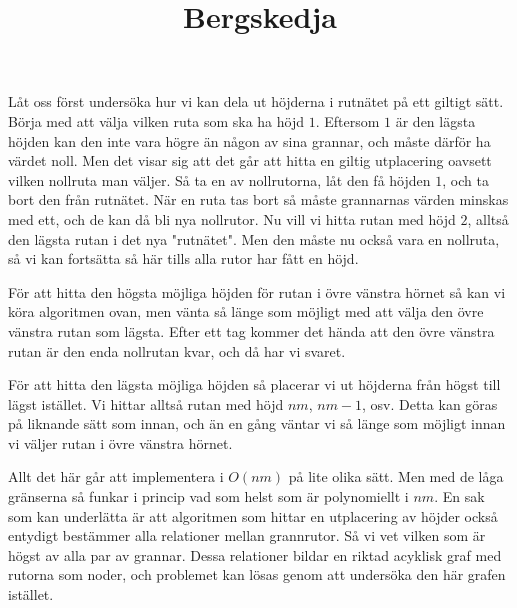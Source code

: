 \documentclass[a4paper,10pt]{article}
\begin{document}
 
\title{Bergskedja}
\date{}
\maketitle

Låt oss först undersöka hur vi kan dela ut höjderna i rutnätet på ett giltigt sätt. Börja med att välja vilken ruta som ska ha höjd $1$. Eftersom $1$ är den lägsta höjden kan den inte vara högre än någon av sina grannar, och måste därför ha värdet noll. Men det visar sig att det går att hitta en giltig utplacering oavsett vilken nollruta man väljer. Så ta en av nollrutorna, låt den få höjden $1$, och ta bort den från rutnätet. När en ruta tas bort så måste grannarnas värden minskas med ett, och de kan då bli nya nollrutor. Nu vill vi hitta rutan med höjd $2$, alltså den lägsta rutan i det nya "rutnätet". Men den måste nu också vara en nollruta, så vi kan fortsätta så här tills alla rutor har fått en höjd.
\newline


För att hitta den högsta möjliga höjden för rutan i övre vänstra hörnet så kan vi köra algoritmen ovan, men vänta så länge som möjligt med att välja den övre vänstra rutan som lägsta. Efter ett tag kommer det hända att den övre vänstra rutan är den enda nollrutan kvar, och då har vi svaret.
\newline


För att hitta den lägsta möjliga höjden så placerar vi ut höjderna från högst till lägst istället. Vi hittar alltså rutan med höjd $nm$, $nm-1$, osv. Detta kan göras på liknande sätt som innan, och än en gång väntar vi så länge som möjligt innan vi väljer rutan i övre vänstra hörnet.
\newline

Allt det här går att implementera i $O(nm)$ på lite olika sätt. Men med de låga gränserna så funkar i princip vad som helst som är polynomiellt i $nm$. En sak som kan underlätta är att algoritmen som hittar en utplacering av höjder också entydigt bestämmer alla relationer mellan grannrutor. Så vi vet vilken som är högst av alla par av grannar. Dessa relationer bildar en riktad acyklisk graf med rutorna som noder, och problemet kan lösas genom att undersöka den här grafen istället.
\end{document}
